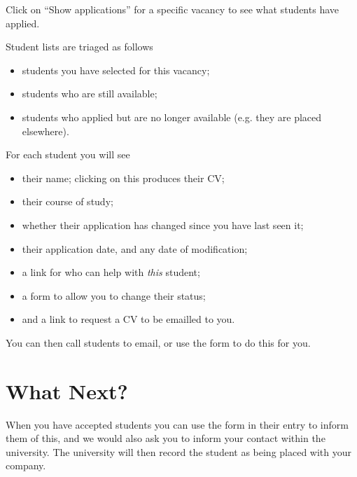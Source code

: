 \documentclass{article}
\begin{document}
Click on ``Show applications'' for a specific vacancy to see
what students have applied.

Student lists are triaged as follows
\begin{itemize}
\item students you have selected for this vacancy;
\item students who are still available;
\item students who applied but are no longer available (e.g. they are placed elsewhere).
\end{itemize}

For each student you will see
\begin{itemize}
\item their name; clicking on this produces their CV;
\item their course of study;
\item whether their application has changed since you have last seen it;
\item their application date, and any date of modification;
\item a link for who can help with \emph{this} student;
\item a form to allow you to change their status;
\item and a link to request a CV to be emailled to you.
\end{itemize}

You can then call students to email, or use the form to do this
for you.

\section{What Next?}

When you have accepted students you can use the form in their
entry to inform them of this, and we would also ask you to
inform your contact within the university. The university will
then record the student as being placed with your company.
\end{document}
